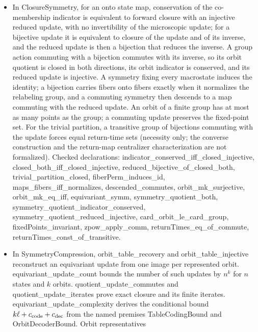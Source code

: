 \documentclass[11pt,a4paper]{article}
\newcommand{\lean}[1]{{\ttfamily\small
  \let\leanunderscore\_\def\_{\leanunderscore\allowbreak}#1}}
\begin{document}
\begin{itemize}[leftmargin=1.4em,itemsep=1pt]
\item {\raggedright In \lean{ClosureSymmetry}, for an onto state map, conservation of the co-membership indicator is equivalent to forward closure with an injective reduced update, with no invertibility of the microscopic update; for a bijective update it is equivalent to closure of the update and of its inverse, and the reduced update is then a bijection that reduces the inverse. A group action commuting with a bijection commutes with its inverse, so its orbit quotient is closed in both directions, its orbit indicator is conserved, and its reduced update is injective. A symmetry fixing every macrostate induces the identity; a bijection carries fibers onto fibers exactly when it normalizes the relabeling group, and a commuting symmetry then descends to a map commuting with the reduced update. An orbit of a finite group has at most as many points as the group; a commuting update preserves the fixed-point set. For the trivial partition, a transitive group of bijections commuting with the update forces equal return-time sets (necessity only; the converse construction and the return-map centralizer characterization are not formalized).
Checked declarations: \lean{indicator\_conserved\_iff\_closed\_injective}, \lean{closed\_both\_iff\_closed\_injective}, \lean{reduced\_bijective\_of\_closed\_both}, \lean{trivial\_partition\_closed}, \lean{fiberPerm\_induces\_id}, \lean{maps\_fibers\_iff\_normalizes}, \lean{descended\_commutes}, \lean{orbit\_mk\_surjective}, \lean{orbit\_mk\_eq\_iff}, \lean{equivariant\_symm}, \lean{symmetry\_quotient\_both}, \lean{symmetry\_quotient\_indicator\_conserved}, \lean{symmetry\_quotient\_reduced\_injective}, \lean{card\_orbit\_le\_card\_group}, \lean{fixedPoints\_invariant}, \lean{zpow\_apply\_comm}, \lean{returnTimes\_eq\_of\_commute}, \lean{returnTimes\_const\_of\_transitive}.\par}
\item {\raggedright In \lean{SymmetryCompression},
\lean{orbit\_table\_recovery} and \lean{orbit\_table\_injective} reconstruct
an equivariant update from one image per represented orbit.
\lean{equivariant\_update\_count} bounds the number of such updates by
$n^k$ for $n$ states and $k$ orbits. \lean{quotient\_update\_commutes} and
\lean{quotient\_update\_iterates} prove exact closure and its finite iterates.
\lean{equivariant\_update\_complexity} derives the conditional bound
$k\ell+c_{\rm code}+c_{\rm dec}$ from the named premises
\lean{TableCodingBound} and \lean{OrbitDecoderBound}. Orbit representatives
}
\end{itemize}
\end{document}
